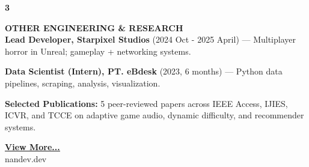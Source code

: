 \documentclass[11pt,a4paper]{article}
\begin{document}
\begin{minipage}[t]{18cm}
\begin{minipage}[t]{17cm}
\end{minipage}

\vspace{0.5cm}

\begin{minipage}[t]{0.8cm}
{\Large\bfseries 3}
\end{minipage}%
\begin{minipage}[t]{17cm}
{\large\bfseries OTHER ENGINEERING \& RESEARCH}\\[8pt]

\textbf{Lead Developer, Starpixel Studios} (2024 Oct - 2025 April) — Multiplayer horror in Unreal; gameplay + networking systems.

\vspace{0.2cm}

\textbf{Data Scientist (Intern), PT. eBdesk} (2023, 6 months) — Python data pipelines, scraping, analysis, visualization.

\vspace{0.2cm}

\textbf{Selected Publications:} 5 peer-reviewed papers across IEEE Access, IJIES, ICVR, and TCCE on adaptive game audio, dynamic difficulty, and recommender systems.

\end{minipage}

\vspace{0.8cm}

\begin{center}
\href{https://nandev.dev}{\bfseries\color{accent}\underline{View More...}}\\[4pt]
{\small nandev.dev}
\end{center}

\end{minipage}
\end{document}
